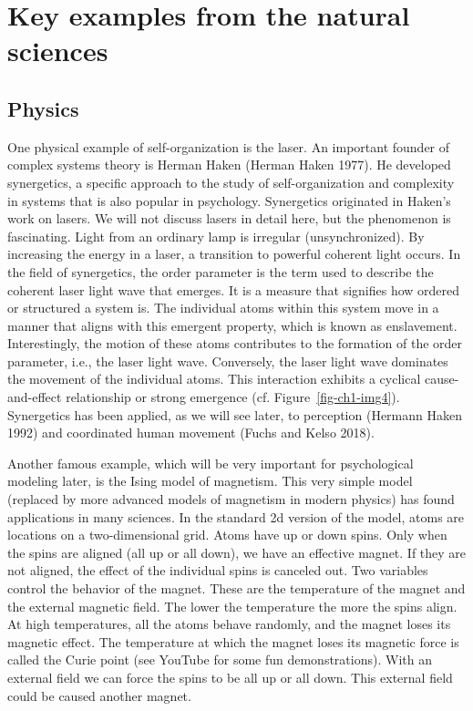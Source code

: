 \documentclass[
  a4paper,
  DIV=11,
  numbers=noendperiod]{scrreprt}
\begin{document}
\hypertarget{sec-Key-examples-from-the-natural-sciences}{%
\section{Key examples from the natural
sciences}\label{sec-Key-examples-from-the-natural-sciences}}

\hypertarget{sec-Physics}{%
\subsection{Physics}\label{sec-Physics}}

One physical example of self-organization is the laser. An important
founder of complex systems theory is Herman Haken (Herman Haken 1977).
He developed synergetics, a specific approach to the study of
self-organization and complexity in systems that is also popular in
psychology. Synergetics originated in Haken's work on lasers. We will
not discuss lasers in detail here, but the phenomenon is fascinating.
Light from an ordinary lamp is irregular (unsynchronized). By increasing
the energy in a laser, a transition to powerful coherent light occurs.
In the field of synergetics, the order parameter is the term used to
describe the coherent laser light wave that emerges. It is a measure
that signifies how ordered or structured a system is. The individual
atoms within this system move in a manner that aligns with this emergent
property, which is known as enslavement. Interestingly, the motion of
these atoms contributes to the formation of the order parameter, i.e.,
the laser light wave. Conversely, the laser light wave dominates the
movement of the individual atoms. This interaction exhibits a cyclical
cause-and-effect relationship or strong emergence (cf.
Figure~\ref{fig-ch1-img4}). Synergetics has been applied, as we will see
later, to perception (Hermann Haken 1992) and coordinated human movement
(Fuchs and Kelso 2018).

Another famous example, which will be very important for psychological
modeling later, is the Ising model of magnetism. This very simple model
(replaced by more advanced models of magnetism in modern physics) has
found applications in many sciences. In the standard 2d version of the
model, atoms are locations on a two-dimensional grid. Atoms have up or
down spins. Only when the spins are aligned (all up or all down), we
have an effective magnet. If they are not aligned, the effect of the
individual spins is canceled out. Two variables control the behavior of
the magnet. These are the temperature of the magnet and the external
magnetic field. The lower the temperature the more the spins align. At
high temperatures, all the atoms behave randomly, and the magnet loses
its magnetic effect. The temperature at which the magnet loses its
magnetic force is called the Curie point (see YouTube for some fun
demonstrations). With an external field we can force the spins to be all
up or all down. This external field could be caused another magnet.
\end{document}
